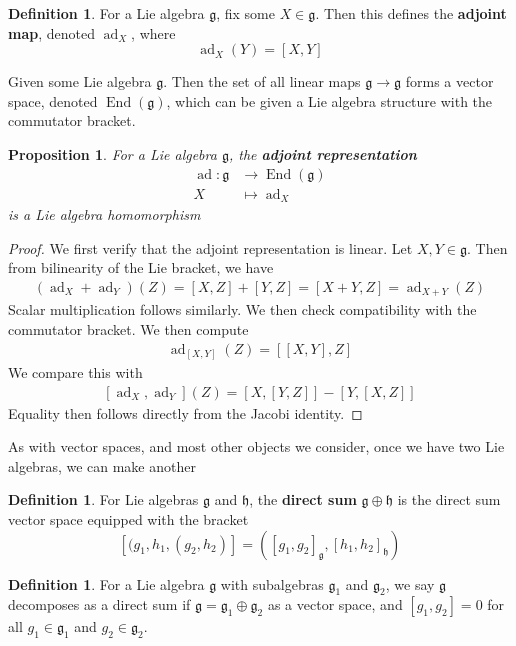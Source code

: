 \documentclass[psamsfonts]{amsart}
\newtheorem{prop}[thm]{Proposition}
\theoremstyle{definition}
\newtheorem{defn}[thm]{Definition}
\theoremstyle{remark}
\newcommand{\g}{\mathfrak{g}}
\newcommand{\bra}[2]{ \left[ #1, #2 \right] }
\DeclareMathOperator{\ad}{ad}
\DeclareMathOperator{\End}{End}
\begin{document}
\begin{defn}
For a Lie algebra $\mathfrak{g}$, fix some $X \in \mathfrak{g}$. Then this defines the \textbf{adjoint map}, denoted $\ad_X$, where
$$\ad_X(Y) = \bra{X}{Y} $$
\end{defn}

Given some Lie algebra $\g$. Then the set of all linear maps $\g \to \g$ forms a vector space, denoted $\End(\g)$, which can be given a Lie algebra structure with the commutator bracket.

\begin{prop}
For a Lie algebra $\g$, the \textbf{adjoint representation}
\begin{align*}
\ad: \g &\to \End(\g) \\
X &\mapsto \ad_X
\end{align*}
is a Lie algebra homomorphism
\end{prop}

\begin{proof}
We first verify that the adjoint representation is linear. Let $X,Y \in \g$. Then from bilinearity of the Lie bracket, we have
\begin{align*}
\left(  \ad_X + \ad_Y \right)(Z) = \bra{X}{Z} + \bra {Y}{Z} = \bra{X + Y}{Z} = \ad_{X+Y}(Z)
\end{align*}
Scalar multiplication follows similarly. We then check compatibility with the commutator bracket. We then compute
\begin{align*}
\ad_{\bra{X}{Y}}(Z) = \bra{\bra{X}{Y}}{Z}
\end{align*}
We compare this with
\begin{align*}
\bra{\ad_X}{\ad_Y}(Z) = \bra{X}{\bra{Y}{Z}} - \bra{Y}{\bra{X}{Z}}
\end{align*}
Equality then follows directly from the Jacobi identity.
\end{proof}

As with vector spaces, and most other objects we consider, once we have two Lie algebras, we can make another
\begin{defn}
For Lie algebras $\g$ and $\mathfrak{h}$, the \textbf{direct sum} $\g \oplus \mathfrak{h}$ is the direct sum vector space equipped with the bracket
$$\bra{(g_1,h_1}{(g_2,h_2)} = \left( \bra{g_1}{g_2}_\g, \bra{h_1}{h_2}_\mathfrak{h}  \right) $$
\end{defn}

\begin{defn}
For a Lie algebra $\g$ with subalgebras $\g_1$ and $\g_2$, we say $\g$ decomposes as a direct sum if $\g = \g_1 \oplus \g_2$ as a vector space, and $\bra{g_1}{g_2} = 0$ for all $g_1 \in \g_1$ and $g_2 \in \g_2$.
\end{defn}
\end{document}
